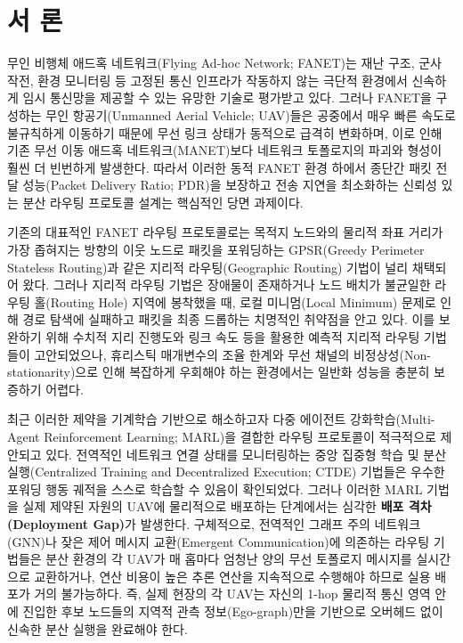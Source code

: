 \section{서 론}
\label{sec:서론}

무인 비행체 애드혹 네트워크(Flying Ad-hoc Network; FANET)는 재난 구조, 군사 작전, 환경 모니터링 등 고정된 통신 인프라가 작동하지 않는 극단적 환경에서 신속하게 임시 통신망을 제공할 수 있는 유망한 기술로 평가받고 있다. 그러나 FANET을 구성하는 무인 항공기(Unmanned Aerial Vehicle; UAV)들은 공중에서 매우 빠른 속도로 불규칙하게 이동하기 때문에 무선 링크 상태가 동적으로 급격히 변화하며, 이로 인해 기존 무선 이동 애드혹 네트워크(MANET)보다 네트워크 토폴로지의 파괴와 형성이 훨씬 더 빈번하게 발생한다. 따라서 이러한 동적 FANET 환경 하에서 종단간 패킷 전달 성능(Packet Delivery Ratio; PDR)을 보장하고 전송 지연을 최소화하는 신뢰성 있는 분산 라우팅 프로토콜 설계는 핵심적인 당면 과제이다.

기존의 대표적인 FANET 라우팅 프로토콜로는 목적지 노드와의 물리적 좌표 거리가 가장 좁혀지는 방향의 이웃 노드로 패킷을 포워딩하는 GPSR(Greedy Perimeter Stateless Routing)\cite{gpsr}과 같은 지리적 라우팅(Geographic Routing) 기법이 널리 채택되어 왔다. 그러나 지리적 라우팅 기법은 장애물이 존재하거나 노드 배치가 불균일한 라우팅 홀(Routing Hole) 지역에 봉착했을 때, 로컬 미니멈(Local Minimum) 문제로 인해 경로 탐색에 실패하고 패킷을 최종 드롭하는 치명적인 취약점을 안고 있다. 이를 보완하기 위해 수치적 지리 진행도와 링크 속도 등을 활용한 예측적 지리적 라우팅 기법들이 고안되었으나, 휴리스틱 매개변수의 조율 한계와 무선 채널의 비정상성(Non-stationarity)으로 인해 복잡하게 우회해야 하는 환경에서는 일반화 성능을 충분히 보증하기 어렵다.

최근 이러한 제약을 기계학습 기반으로 해소하고자 다중 에이전트 강화학습(Multi-Agent Reinforcement Learning; MARL)을 결합한 라우팅 프로토콜이 적극적으로 제안되고 있다. 전역적인 네트워크 연결 상태를 모니터링하는 중앙 집중형 학습 및 분산 실행(Centralized Training and Decentralized Execution; CTDE) 기법들은 우수한 포워딩 행동 궤적을 스스로 학습할 수 있음이 확인되었다. 그러나 이러한 MARL 기법을 실제 제약된 자원의 UAV에 물리적으로 배포하는 단계에서는 심각한 \textbf{배포 격차(Deployment Gap)}가 발생한다. 구체적으로, 전역적인 그래프 주의 네트워크(GNN)나 잦은 제어 메시지 교환(Emergent Communication)에 의존하는 라우팅 기법들은 분산 환경의 각 UAV가 매 홉마다 엄청난 양의 무선 토폴로지 메시지를 실시간으로 교환하거나, 연산 비용이 높은 추론 연산을 지속적으로 수행해야 하므로 실용 배포가 거의 불가능하다. 즉, 실제 현장의 각 UAV는 자신의 1-hop 물리적 통신 영역 안에 진입한 후보 노드들의 지역적 관측 정보(Ego-graph)만을 기반으로 오버헤드 없이 신속한 분산 실행을 완료해야 한다.

